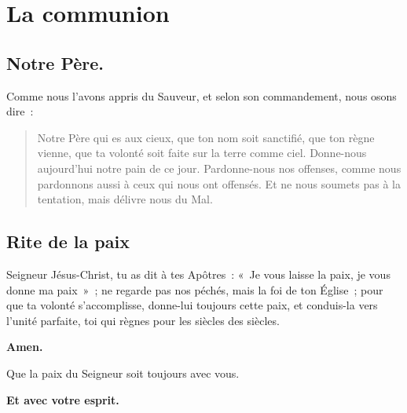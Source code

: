 





\section*{La communion}

\subsection*{Notre Père.}


Comme nous l'avons appris du Sauveur, et selon son commandement, nous
osons dire~:

\begin{verse}
\noindent
Notre Père qui es aux cieux,\newline
que ton nom soit sanctifié,\newline
que ton règne vienne,\newline
que ta volonté soit faite\newline
sur la terre comme ciel.\newline
Donne-nous aujourd'hui\newline
notre pain de ce jour.\newline
Pardonne-nous nos offenses,\newline
comme nous pardonnons aussi\newline
à ceux qui nous ont offensés.\newline
Et ne nous soumets pas à la tentation,\newline
mais délivre nous du Mal.\newline
\end{verse}

\subsection*{Rite de la paix}

Seigneur Jésus-Christ, tu as dit à tes Apôtres~: «~Je vous laisse la            
paix, je vous donne ma paix~»~; ne regarde pas nos péchés, mais la
foi de ton Église~; pour que ta volonté s'accomplisse, donne-lui
toujours cette paix, et conduis-la vers l'unité parfaite, toi qui
règnes pour les siècles des siècles.

{\bf Amen.}

Que la paix du Seigneur soit toujours avec vous.

{\bf Et avec votre esprit.}

